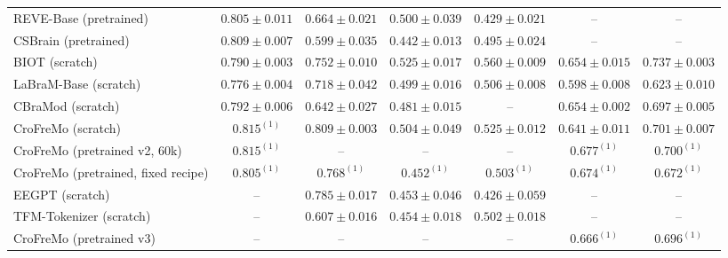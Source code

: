 \begin{table}[h]
\begin{tabular}{lcccccc}
REVE-Base (pretrained) & $0.805 \pm 0.011$ & $0.664 \pm 0.021$ & $0.500 \pm 0.039$ & $0.429 \pm 0.021$ & -- & -- \\
CSBrain (pretrained) & $0.809 \pm 0.007$ & $0.599 \pm 0.035$ & $0.442 \pm 0.013$ & $0.495 \pm 0.024$ & -- & -- \\
BIOT (scratch) & $0.790 \pm 0.003$ & $0.752 \pm 0.010$ & $0.525 \pm 0.017$ & $0.560 \pm 0.009$ & $0.654 \pm 0.015$ & $0.737 \pm 0.003$ \\
LaBraM-Base (scratch) & $0.776 \pm 0.004$ & $0.718 \pm 0.042$ & $0.499 \pm 0.016$ & $0.506 \pm 0.008$ & $0.598 \pm 0.008$ & $0.623 \pm 0.010$ \\
CBraMod (scratch) & $0.792 \pm 0.006$ & $0.642 \pm 0.027$ & $0.481 \pm 0.015$ & -- & $0.654 \pm 0.002$ & $0.697 \pm 0.005$ \\
CroFreMo (scratch) & $0.815^{(1)}$ & $0.809 \pm 0.003$ & $0.504 \pm 0.049$ & $0.525 \pm 0.012$ & $0.641 \pm 0.011$ & $0.701 \pm 0.007$ \\
CroFreMo (pretrained v2, 60k) & $0.815^{(1)}$ & -- & -- & -- & $0.677^{(1)}$ & $0.700^{(1)}$ \\
CroFreMo (pretrained, fixed recipe) & $0.805^{(1)}$ & $0.768^{(1)}$ & $0.452^{(1)}$ & $0.503^{(1)}$ & $0.674^{(1)}$ & $0.672^{(1)}$ \\
EEGPT (scratch) & -- & $0.785 \pm 0.017$ & $0.453 \pm 0.046$ & $0.426 \pm 0.059$ & -- & -- \\
TFM-Tokenizer (scratch) & -- & $0.607 \pm 0.016$ & $0.454 \pm 0.018$ & $0.502 \pm 0.018$ & -- & -- \\
CroFreMo (pretrained v3) & -- & -- & -- & -- & $0.666^{(1)}$ & $0.696^{(1)}$ \\
\bottomrule
\end{tabular}
\end{table}
